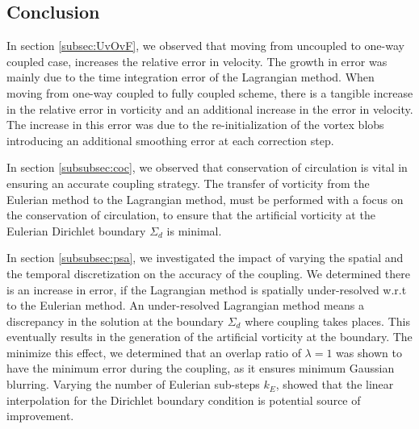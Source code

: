 
%

\subsection{Conclusion}

In section \ref{subsec:UvOvF}, we observed that moving from uncoupled to one-way coupled case, increases the relative error in velocity. The growth in error was mainly due to the time integration error of the Lagrangian method. When moving from one-way coupled to fully coupled scheme, there is a tangible increase in the relative error in vorticity and an additional increase in the error in velocity. The increase in this error was due to the re-initialization of the vortex blobs introducing an additional smoothing error at each correction step. 

In section \ref{subsubsec:coc}, we observed that conservation of circulation is vital in ensuring an accurate coupling strategy. The transfer of vorticity from the Eulerian method to the Lagrangian method, must be performed with a focus on the conservation of circulation, to ensure that the artificial vorticity at the Eulerian Dirichlet boundary $\Sigma_d$ is minimal.

In section \ref{subsubsec:psa}, we investigated the impact of varying the spatial and the temporal discretization on the accuracy of the coupling. We determined there is an increase in error, if the Lagrangian method is spatially under-resolved w.r.t to the Eulerian method. An under-resolved Lagrangian method means a discrepancy in the solution at the boundary $\Sigma_d$ where coupling takes places. This eventually results in the generation of the artificial vorticity at the boundary. The minimize this effect, we determined that an overlap ratio of $\lambda=1$ was shown to have the minimum error during the coupling, as it ensures minimum Gaussian blurring. Varying the number of Eulerian sub-steps $k_E$, showed that the linear interpolation for the Dirichlet boundary condition is potential source of improvement.


